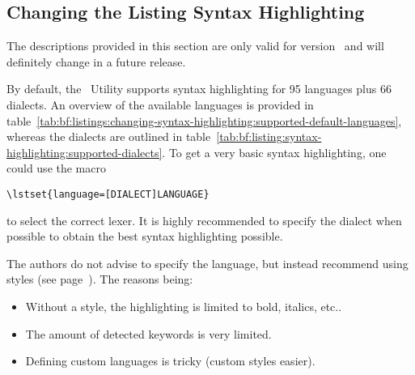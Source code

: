 	\subsection{Changing the Listing Syntax Highlighting}
		\label{sec:bf:listings:syntax-highlighting}
		\begin{daWarningBox}
			The descriptions provided in this section are only valid for version \mbox{\productVersion}~and will definitely change in a future release.
		\end{daWarningBox}
		By default, the \productName~Utility supports syntax highlighting for 95 languages plus 66 dialects. An overview of the available languages is provided in \mbox{table \ref{tab:bf:listings:changing-syntax-highlighting:supported-default-languages}}, whereas the dialects are outlined in \mbox{table \ref{tab:bf:listing:syntax-highlighting:supported-dialects}}.
		\newline To get a very basic syntax highlighting, one could use the macro\\[-1cm]
		\begin{center}
			\lstinline$\lstset{language=[DIALECT]LANGUAGE}$
		\end{center}
		\vspace{-0.5cm}
		to select the correct lexer. It is highly recommended to specify the dialect when possible to obtain the best syntax highlighting possible.
		\begin{daWarningBox}
			The authors do not advise to specify the language, but instead recommend using styles (see \mbox{page \pageref{tab:bf:listing:syntax-highlighting:supported-dialects}}). The reasons being:\\[-0.75cm]
			\begin{itemize}
				\setlength\itemsep{-0.25em}
				\item Without a style, the highlighting is limited to bold, italics, etc..
				\item The amount of detected keywords is very limited.
				\item Defining custom languages is tricky (custom styles easier).
			\end{itemize}
		\end{daWarningBox}
		
